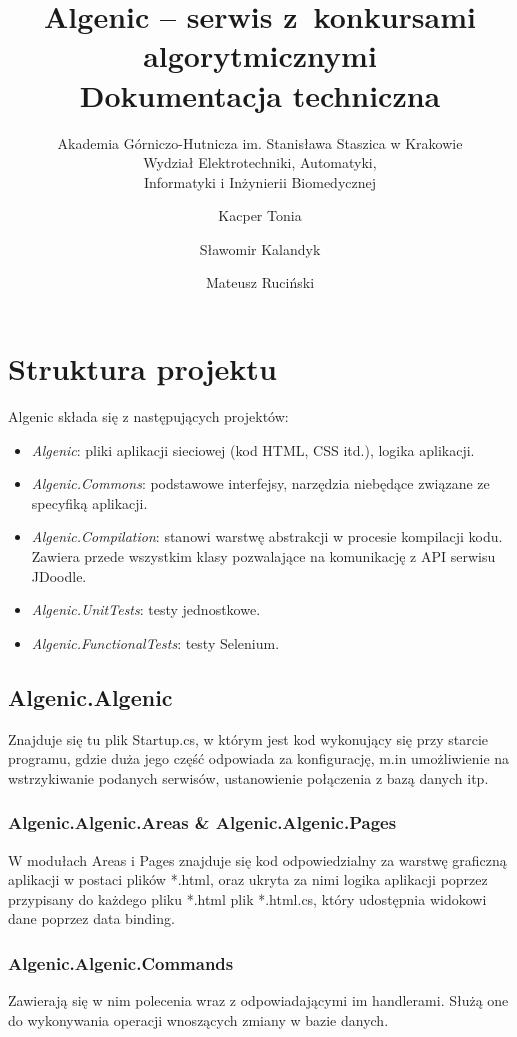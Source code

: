 \documentclass{article}
\title{Algenic -- serwis z~konkursami algorytmicznymi\\
    Dokumentacja techniczna}
\subtitle{Akademia Górniczo-Hutnicza im. Stanisława Staszica w Krakowie\\
	Wydział Elektrotechniki, Automatyki,\\
	Informatyki i Inżynierii Biomedycznej}
\author{Kacper Tonia\and
		Sławomir Kalandyk\and
		Mateusz Ruciński}
\date{}
\begin{document}
\maketitle

\section{Struktura projektu}
Algenic składa się z następujących projektów:
\begin{itemize}
    \item \textit{Algenic}: pliki aplikacji sieciowej (kod HTML, CSS itd.), logika aplikacji.
    \item \textit{Algenic.Commons}: podstawowe interfejsy, narzędzia niebędące związane ze specyfiką aplikacji.
    \item \textit{Algenic.Compilation}: stanowi warstwę abstrakcji w procesie kompilacji kodu. Zawiera przede wszystkim klasy pozwalające na komunikację z API serwisu JDoodle.
    \item \textit{Algenic.UnitTests}: testy jednostkowe.
    \item \textit{Algenic.FunctionalTests}: testy Selenium.
\end{itemize}
\subsection{Algenic.Algenic}
Znajduje się tu plik Startup.cs, w którym jest kod wykonujący się przy starcie programu, gdzie duża jego część odpowiada za konfigurację, m.in umożliwienie na wstrzykiwanie podanych serwisów, ustanowienie połączenia z bazą danych itp.
\subsubsection{Algenic.Algenic.Areas \& Algenic.Algenic.Pages}
W modułach Areas i Pages znajduje się kod odpowiedzialny za warstwę graficzną aplikacji w postaci plików *.html, oraz ukryta za nimi logika aplikacji poprzez przypisany do każdego pliku *.html plik *.html.cs, który udostępnia widokowi dane poprzez data binding.
\subsubsection{Algenic.Algenic.Commands}
Zawierają się w nim polecenia wraz z odpowiadającymi im handlerami. Służą one do wykonywania operacji wnoszących zmiany w bazie danych.
\end{document}
